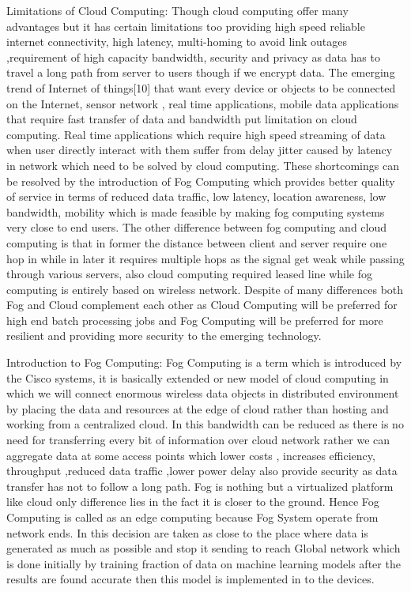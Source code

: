Limitations of Cloud Computing:
Though cloud computing offer many advantages but it has certain limitations too providing high speed reliable
internet connectivity, high latency, multi-homing to avoid link outages ,requirement of high capacity bandwidth,
security and privacy as data has to travel a long path from server to users though if we encrypt data. The
emerging trend of Internet of things[10] that want every device or objects to be connected on the Internet,
sensor network , real time applications, mobile data applications that require fast transfer of data and bandwidth
put limitation on cloud computing. Real time applications which require high speed streaming of data when user
directly interact with them suffer from delay jitter caused by latency in network which need to be solved by
cloud computing.
These shortcomings can be resolved by the introduction of Fog Computing which provides better quality of
service in terms of reduced data traffic, low latency, location awareness, low bandwidth, mobility which is made
feasible by making fog computing systems very close to end users.
The other difference between fog computing and cloud computing is that in former the distance between client
and server require one hop in while in later it requires multiple hops as the signal get weak while passing
through various servers, also cloud computing required leased line while fog computing is entirely based on
wireless network. Despite of many differences both Fog and Cloud complement each other as Cloud Computing
will be preferred for high end batch processing jobs and Fog Computing will be preferred for more resilient and
providing more security to the emerging technology.


Introduction to Fog Computing:
Fog Computing is a term which is introduced by the Cisco systems, it is basically extended or new model of
cloud computing in which we will connect enormous wireless data objects in distributed environment by placing
the data and resources at the edge of cloud rather than hosting and working from a centralized cloud. In this
bandwidth can be reduced as there is no need for transferring every bit of information over cloud network rather
we can aggregate data at some access points which lower costs , increases efficiency, throughput ,reduced data
traffic ,lower power delay also provide security as data transfer has not to follow a long path.
Fog is nothing but a virtualized platform like cloud only difference lies in the fact it is closer to the ground.
Hence Fog Computing is called as an edge computing because Fog System operate from network ends. In
this decision are taken as close to the place where data is generated as much as possible and stop it sending to
reach Global network which is done initially by training fraction of data on machine learning models after the
results are found accurate then this model is implemented in to the devices.


